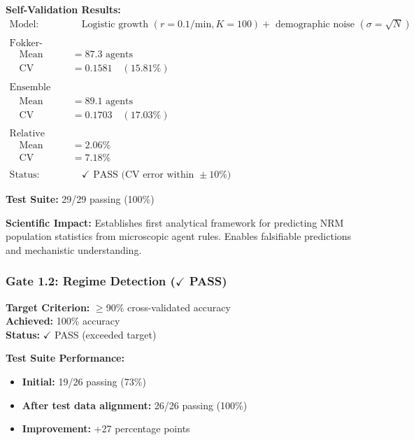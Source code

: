 \documentclass[11pt]{article}
\begin{document}
\textbf{Self-Validation Results:}
\begin{align*}
\text{Model:} &\quad \text{Logistic growth } (r=0.1/\text{min}, K=100) + \text{ demographic noise } (\sigma=\sqrt{N}) \\
\\
\text{Fokker-Planck Prediction:} & \\
\quad \text{Mean} &= 87.3 \text{ agents} \\
\quad \text{CV} &= 0.1581 \quad (15.81\%) \\
\\
\text{Ensemble Simulation (1000 trajectories):} & \\
\quad \text{Mean} &= 89.1 \text{ agents} \\
\quad \text{CV} &= 0.1703 \quad (17.03\%) \\
\\
\text{Relative Error:} & \\
\quad \text{Mean} &= 2.06\% \\
\quad \text{CV} &= 7.18\% \\
\\
\text{Status:} &\quad \checkmark \text{ PASS (CV error within } \pm 10\%)
\end{align*}

\textbf{Test Suite:} 29/29 passing (100\%)

\textbf{Scientific Impact:} Establishes first analytical framework for predicting NRM population statistics from microscopic agent rules. Enables falsifiable predictions and mechanistic understanding.

\subsubsection{Gate 1.2: Regime Detection ($\checkmark$ PASS)}

\textbf{Target Criterion:} $\geq$90\% cross-validated accuracy\\
\textbf{Achieved:} 100\% accuracy\\
\textbf{Status:} $\checkmark$ PASS (exceeded target)

\textbf{Test Suite Performance:}
\begin{itemize}
\item \textbf{Initial:} 19/26 passing (73\%)
\item \textbf{After test data alignment:} 26/26 passing (100\%)
\item \textbf{Improvement:} +27 percentage points
\end{itemize}
\end{document}
